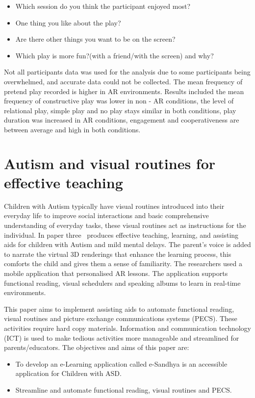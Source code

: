 \begin{itemize}
    \item Which session do you think the participant enjoyed most?  
    \item One thing you like about the play?
    \item Are there other things you want to be on the screen?
    \item Which play is more fun?(with a friend/with the screen) and why?
\end{itemize}

Not all participants data was used for the analysis due to some participants being overwhelmed, and accurate data could not be collected. The mean frequency of pretend play recorded is higher in AR environments. Results included the mean frequency of constructive play was lower in non - AR conditions, the level of relational play, simple play and no play stays similar in both conditions, play duration was increased in AR conditions, engagement and cooperativeness are between average and high in both conditions.

\section{Autism and visual routines for effective teaching}
Children with Autism typically have visual routines introduced into their everyday life to improve social interactions and basic comprehensive understanding of everyday tasks, these visual routines act as instructions for the individual. In paper three~\cite{Reference21}  produces effective teaching, learning, and assisting aids for children with Autism and mild mental delays. The parent's voice is added to narrate the virtual 3D renderings that enhance the learning process, this comforts the child and gives them a sense of familiarity. The researchers used a mobile application that personalised AR lessons. The application supports functional reading, visual schedulers and speaking albums to learn in real-time environments.

This paper aims to implement assisting aids to automate functional reading, visual routines and picture exchange communications systems (PECS). These activities require hard copy materials. Information and communication technology (ICT) is used to make tedious activities more manageable and streamlined for parents/educators. The objectives and aims of this paper are:

\begin{itemize}
    \item To develop an e-Learning application called e-Sandhya is an accessible application for Children with ASD.  
    \item Streamline and automate functional reading, visual routines and PECS.
\end{itemize}

